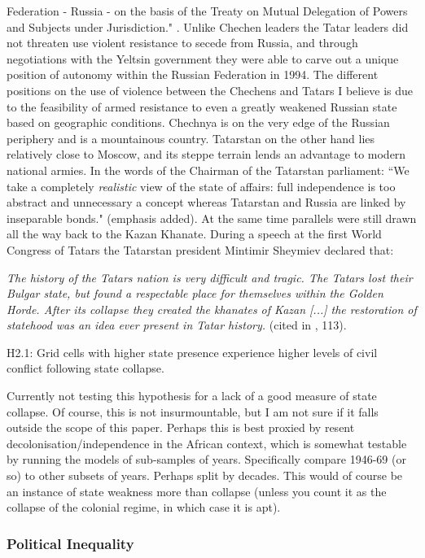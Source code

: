 \documentclass[12pt]{article}
\begin{document}
\begin{multicols}{2}
Federation - Russia - on the basis of the Treaty on Mutual Delegation of Powers
and Subjects under Jurisdiction." \citet{Sharifzhanov_2007}. Unlike Chechen
leaders the Tatar leaders did not threaten use violent resistance to secede from
Russia, and through negotiations with the Yeltsin government they were able to
carve out a unique position of autonomy within the Russian Federation in 1994.
The different positions on the use of violence between the Chechens and Tatars
I believe is due to the feasibility of armed resistance to even a greatly
weakened Russian state based on geographic conditions. Chechnya is on the very
edge of the Russian periphery and is a mountainous country. Tatarstan on the
other hand lies relatively close to Moscow, and its steppe terrain lends an
advantage to modern national armies. In the words of the Chairman of the
Tatarstan parliament: ``We take a completely \textit{realistic} view of the
state of affairs: full independence is too abstract and unnecessary a concept
whereas Tatarstan and Russia are linked by inseparable bonds."
\citep{Sharifzhanov_2007}(emphasis added). At the same time parallels were still
drawn all the way back to the Kazan Khanate. During a speech at the first World
Congress of Tatars the Tatarstan president Mintimir Sheymiev declared that:

\textit{The history of the Tatars nation is very difficult and tragic. The
Tatars lost their Bulgar state, but found a respectable place for themselves
within the Golden Horde. After its collapse they created the khanates of Kazan
[...] the restoration of statehood was an idea ever present in Tatar history.}
(cited in \citet{mustafin1995pervyi}, 113).

H2.1: Grid cells with higher state presence experience higher levels of civil
conflict following state collapse. 

Currently not testing this hypothesis for a lack of a good measure of state
collapse. Of course, this is not insurmountable, but I am not sure if it
falls outside the scope of this paper. Perhaps this is best proxied by resent
decolonisation/independence in the African context, which is somewhat testable
by running the models of sub-samples of years. Specifically compare 1946-69 (or
so) to other subsets of years. Perhaps split by decades. This would of course
be an instance of state weakness more than collapse (unless you count it as the
collapse of the colonial regime, in which case it is apt).

\subsubsection{Political Inequality}


\end{multicols}
\end{document}
